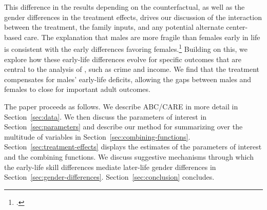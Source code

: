 This difference in the results depending on the counterfactual, as well as the gender differences in the treatment effects, drives our discussion of the interaction between the treatment, the family inputs, and any potential alternate center-based care. The explanation that males are more fragile than females early in life is consistent with the early differences favoring females.\footnote{\citet{Kottelenberg-Lehrer_2014_Gender-Effects,Baker_Gruber_Milligan_2015_Noncog_Defects, Schore_2017_IMHJ}.} Building on this, we explore how these early-life differences evolve for specific outcomes that are central to the analysis of  \citet{Garcia_Heckman_Leaf_etal_2017_Comp_CBA_Unpublished}, such as crime and income. We find that the treatment compensates for males' early-life deficits, allowing the gaps between males and females to close for important adult outcomes.

The paper proceeds as follows. We describe ABC/CARE in more detail in Section~\ref{sec:data}. We then discuss the parameters of interest in Section~\ref{sec:parameters} and describe our method for summarizing over the multitude of variables in Section~\ref{sec:combining-functions}. Section~\ref{sec:treatment-effects} displays the estimates of the parameters of interest and the combining functions. We discuss suggestive mechanisms through which the early-life skill differences mediate later-life gender differences in Section~\ref{sec:gender-differences}. Section~\ref{sec:conclusion} concludes.

